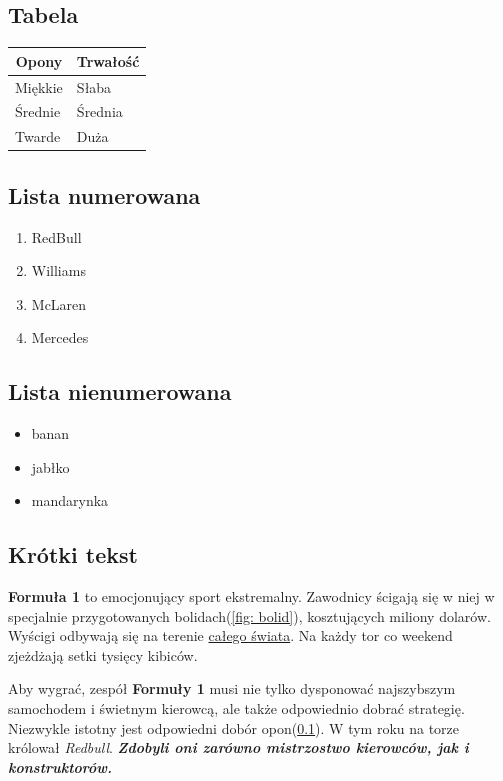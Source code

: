\newpage

\subsection{Tabela}
\label{tab: ściganie}

\begin{table}[h!]
\centering
\begin{tabular}{|l|l|}
\hline
\multicolumn{1}{|c|}{\textbf{Opony}} & \multicolumn{1}{c|}{\textbf{Trwałość}} \\ \hline
Miękkie                     & Słaba                         \\ \hline
Średnie                     & Średnia                       \\ \hline
Twarde                      & Duża                          \\ \hline
\end{tabular}
\end{table}


\subsection{Lista numerowana}

\begin{enumerate}
    \item RedBull
    \item Williams
    \item McLaren
    \item Mercedes
\end{enumerate}

\subsection{Lista nienumerowana}

\begin{itemize}
    \item banan
    \item jabłko
    \item mandarynka
\end{itemize}

\subsection{Krótki tekst}

\textbf{Formuła 1} to emocjonujący sport ekstremalny. Zawodnicy ścigają się w niej w specjalnie przygotowanych bolidach(\ref{fig: bolid}), kosztujących miliony dolarów. Wyścigi odbywają się na terenie \underline{całego świata}.
Na każdy tor co weekend zjeżdżają setki tysięcy kibiców. 

Aby wygrać, zespół \textbf{Formuły 1} musi nie tylko dysponować najszybszym samochodem i świetnym kierowcą, ale także odpowiednio dobrać strategię. Niezwykle istotny jest odpowiedni dobór opon(\ref{tab: ściganie}). W tym roku na torze królował \emph{Redbull}. \emph{\textbf{\large Zdobyli oni zarówno mistrzostwo kierowców, jak i konstruktorów. \normalsize}}
